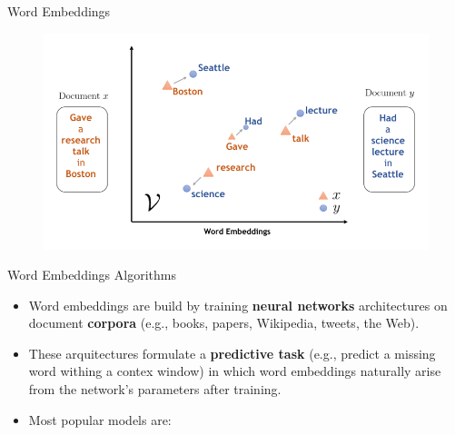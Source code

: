 \documentclass[handout]{beamer}
\begin{document}
\begin{frame}{Word Embeddings}
\begin{figure}[h]
  \includegraphics[scale=0.7]{pics/embeddings2.png}
\end{figure}



\end{frame}



\begin{frame}{Word Embeddings Algorithms}
\begin{scriptsize}
\begin{itemize}
\item Word embeddings are build by training \textbf{neural networks} architectures on document \textbf{corpora} (e.g., books, papers, Wikipedia, tweets, the Web).

\item These arquitectures formulate a \textbf{predictive task} (e.g., predict a missing word withing a contex window) in which word embeddings naturally arise from the network's parameters after training.

\item Most popular models are:




\end{itemize}
\end{scriptsize}
\end{frame}
\end{document}
